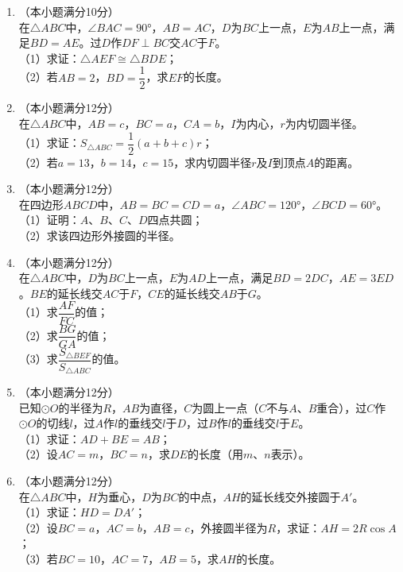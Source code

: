 \documentclass[12pt, a4paper]{ctexart}
\begin{document}
\begin{enumerate}[label=\arabic*.]

\item （本小题满分10分）\\
在$\triangle ABC$中，$\angle BAC = 90°$，$AB = AC$，$D$为$BC$上一点，$E$为$AB$上一点，满足$BD = AE$。过$D$作$DF \perp BC$交$AC$于$F$。\\
（1）求证：$\triangle AEF \cong \triangle BDE$；\\
（2）若$AB = 2$，$BD = \dfrac{1}{2}$，求$EF$的长度。
\vspace{6cm}

\item （本小题满分12分）\\
在$\triangle ABC$中，$AB = c$，$BC = a$，$CA = b$，$I$为内心，$r$为内切圆半径。\\
（1）求证：$S_{\triangle ABC} = \dfrac{1}{2}(a+b+c)r$；\\
（2）若$a = 13$，$b = 14$，$c = 15$，求内切圆半径$r$及$I$到顶点$A$的距离。
\vspace{6cm}

\item （本小题满分12分）\\
在四边形$ABCD$中，$AB = BC = CD = a$，$\angle ABC = 120°$，$\angle BCD = 60°$。\\
（1）证明：$A$、$B$、$C$、$D$四点共圆；\\
（2）求该四边形外接圆的半径。
\vspace{6cm}

\item （本小题满分12分）\\
在$\triangle ABC$中，$D$为$BC$上一点，$E$为$AD$上一点，满足$BD = 2DC$，$AE = 3ED$。$BE$的延长线交$AC$于$F$，$CE$的延长线交$AB$于$G$。\\
（1）求$\dfrac{AF}{FC}$的值；\\
（2）求$\dfrac{BG}{GA}$的值；\\
（3）求$\dfrac{S_{\triangle BEF}}{S_{\triangle ABC}}$的值。
\vspace{6cm}

\item （本小题满分12分）\\
已知$\odot O$的半径为$R$，$AB$为直径，$C$为圆上一点（$C$不与$A$、$B$重合），过$C$作$\odot O$的切线$l$，过$A$作$l$的垂线交$l$于$D$，过$B$作$l$的垂线交$l$于$E$。\\
（1）求证：$AD + BE = AB$；\\
（2）设$AC = m$，$BC = n$，求$DE$的长度（用$m$、$n$表示）。
\vspace{6cm}

\item （本小题满分12分）\\
在$\triangle ABC$中，$H$为垂心，$D$为$BC$的中点，$AH$的延长线交外接圆于$A'$。\\
（1）求证：$HD = DA'$；\\
（2）设$BC = a$，$AC = b$，$AB = c$，外接圆半径为$R$，求证：$AH = 2R\cos A$；\\
（3）若$BC = 10$，$AC = 7$，$AB = 5$，求$AH$的长度。
\vspace{6cm}

\end{enumerate}
\end{document}
